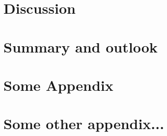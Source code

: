 \documentclass[twoside,english]{uiofysmaster/uiofysmaster}
\begin{document}
\chapter{Discussion}



\chapter{Summary and outlook}







\begin{appendices}
\chapter{Some Appendix}


\chapter{Some other appendix...}

\end{appendices}



%


\end{document}
